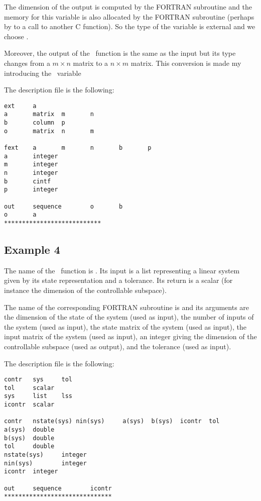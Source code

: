 The dimension  of the output  is computed by the FORTRAN subroutine
and the memory for this variable is also allocated by the FORTRAN subroutine
(perhaps by to a call to another C function). So the type of the variable is
external and we choose .

Moreover, the output  of the \SCI\ function is the same as the input
but its type changes from a $m \times n$ matrix to a $n \times m$ matrix. This
conversion is made my introducing the \SCI\ variable 

The description file is the following:
\begin{verbatim}
ext     a
a       matrix  m       n
b       column  p
o       matrix  n       m

fext    a       m       n       b       p
a       integer
m       integer
n       integer
b       cintf
p       integer

out     sequence        o       b
o       a
***************************
\end{verbatim}

\subsection{Example 4}
\label{ex4}

The name of the \SCI\ function is . Its input is a list representing
a linear system given by its state representation and a tolerance. Its return
is a scalar (for instance the dimension of the controllable subspace).

The name of the corresponding FORTRAN subroutine is  and its
arguments are the dimension of the state of the system (used as input), the
number of inputs of the system (used as input), 
the state matrix of the system (used as input),
the input matrix of the system (used as input),
an integer giving the dimension of the controllable subspace (used as output),
and the tolerance (used as input).

The description file is the following:
\begin{verbatim}
contr   sys     tol
tol     scalar
sys     list    lss
icontr  scalar

contr   nstate(sys)	nin(sys)     a(sys)  b(sys)  icontr  tol
a(sys)  double
b(sys)  double
tol     double
nstate(sys)     integer
nin(sys)        integer
icontr  integer

out     sequence        icontr
******************************
\end{verbatim}

